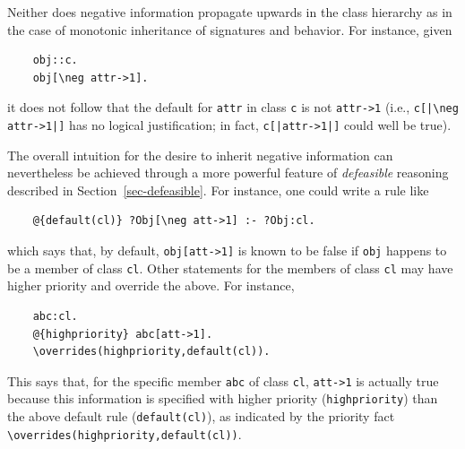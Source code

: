 \documentclass[11pt]{article}
\newcommand{\bs}{\textbackslash}
\newcommand{\RULELOGNEG}{{\texttt{{\bs}neg}}\xspace}
\begin{document}
Neither does negative information propagate upwards in the class hierarchy as
in the case of monotonic inheritance of signatures and behavior. For
instance, given
\begin{verbatim}
    obj::c.
    obj[\neg attr->1].
\end{verbatim}
it does not follow that the default for \texttt{attr} in class \texttt{c}
is not \texttt{attr->1} (i.e., \texttt{c[|\RULELOGNEG attr->1|]} has no logical
justification; in fact, \texttt{c[|attr->1|]} could well be true).

The overall intuition for the desire to inherit negative information can
nevertheless be achieved through a more powerful feature of \emph{defeasible}
reasoning described in Section~\ref{sec-defeasible}. For instance, one could
write a rule like
\begin{verbatim}
    @{default(cl)} ?Obj[\neg att->1] :- ?Obj:cl.
\end{verbatim}
which says that, by default, \verb|obj[att->1]| is known to be false if
\texttt{obj} happens to be a member of class \texttt{cl}. Other statements
for the members of class \texttt{cl} may have higher priority and override
the above. For instance,
\begin{verbatim}
    abc:cl.
    @{highpriority} abc[att->1].
    \overrides(highpriority,default(cl)).
\end{verbatim}
This says that, for the specific member \texttt{abc} of class \texttt{cl},  
\verb|att->1| is actually true because this information is specified with
higher priority (\texttt{highpriority})  than the above default rule
(\texttt{default(cl)}), as indicated by the priority fact
\texttt{\bs{}overrides(highpriority,default(cl))}. 
\end{document}
